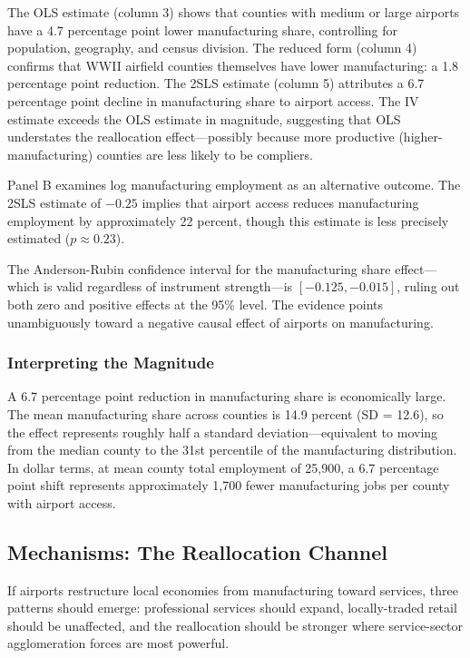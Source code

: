 \documentclass[12pt]{article}
\begin{document}
The OLS estimate (column 3) shows that counties with medium or large airports have a 4.7 percentage point lower manufacturing share, controlling for population, geography, and census division. The reduced form (column 4) confirms that WWII airfield counties themselves have lower manufacturing: a 1.8 percentage point reduction. The 2SLS estimate (column 5) attributes a 6.7 percentage point decline in manufacturing share to airport access. The IV estimate exceeds the OLS estimate in magnitude, suggesting that OLS understates the reallocation effect---possibly because more productive (higher-manufacturing) counties are less likely to be compliers.

Panel B examines log manufacturing employment as an alternative outcome. The 2SLS estimate of $-0.25$ implies that airport access reduces manufacturing employment by approximately 22 percent, though this estimate is less precisely estimated ($p \approx 0.23$).

The Anderson-Rubin confidence interval for the manufacturing share effect---which is valid regardless of instrument strength---is $[-0.125, -0.015]$, ruling out both zero and positive effects at the 95\% level. The evidence points unambiguously toward a negative causal effect of airports on manufacturing.

\subsubsection*{Interpreting the Magnitude} A 6.7 percentage point reduction in manufacturing share is economically large. The mean manufacturing share across counties is 14.9 percent (SD = 12.6), so the effect represents roughly half a standard deviation---equivalent to moving from the median county to the 31st percentile of the manufacturing distribution. In dollar terms, at mean county total employment of 25,900, a 6.7 percentage point shift represents approximately 1,700 fewer manufacturing jobs per county with airport access.

\subsection{Mechanisms: The Reallocation Channel}



If airports restructure local economies from manufacturing toward services, three patterns should emerge: professional services should expand, locally-traded retail should be unaffected, and the reallocation should be stronger where service-sector agglomeration forces are most powerful.
\end{document}
